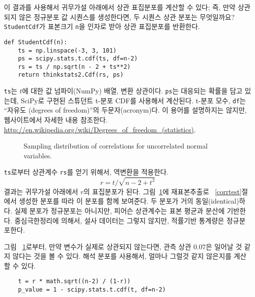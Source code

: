 이 결과를 사용해서 귀무가설 아래에서 상관 표집분포를 계산할 수 있다; 즉, 만약 상관되지 않은 정규분포 값 시퀀스를 생성한다면, 두 시퀀스 상관 분포는 무엇일까요? {\tt StudentCdf}가 표본크기 {\tt n}을 인자로 받아 상관 표집분포를 반환한다.

\begin{verbatim}
def StudentCdf(n):
    ts = np.linspace(-3, 3, 101)
    ps = scipy.stats.t.cdf(ts, df=n-2)
    rs = ts / np.sqrt(n - 2 + ts**2)
    return thinkstats2.Cdf(rs, ps)
\end{verbatim}

{\tt ts}는 $t$에 대한 값 넘파이(NumPy) 배열, 변환 상관이다.
{\tt ps}는 대응되는 확률을 담고 있는데, SciPy로 구현된 스튜던트 t-분포 CDF를 사용해서 계산된다. t-분포 모수, {\tt df}는 ``자유도 (degrees of freedom)''의 두문자(acronym)다. 이 용어를 설명하지는 않지만, 웹사이트에서 자세한 내용 참조한다. \url{http://en.wikipedia.org/wiki/Degrees_of_freedom_(statistics)}.

\begin{figure}
\caption{Sampling distribution of correlations for uncorrelated
normal variables.}
\label{normal4}
\end{figure}

{\tt ts}로부터 상관계수 {\tt rs}를 얻기 위해서, 역변환을 적용한다.
%
\[ r = t / \sqrt{n - 2 + t^2} \]
%
결과는 귀무가설 아래에서 $r$의 표집분포가 된다.
그림~\ref{normal4}에 재표본추출로 ~\ref{corrtest}절에서 생성한 분포를 따라 이 분포를 함께 보여준다.
두 분포가 거의 동일(identical)하다. 실제 분포가 정규분포는 아니지만, 피어슨 상관계수는 표본 평균과 분산에 기반한다. 중심극한정리에 의해서, 설사 데이터는 그렇지 않지만, 적률기반 통계량은 정규분포한다.


그림 ~\ref{normal4}로부터, 만약 변수가 실제로 상관되지 않는다면, 관측 상관 0.07은 일어날 것 같지 않다는 것을 볼 수 있다. 해석 분포를 사용해서, 얼마나 그럴것 같지 않은지를 계산할 수 있다.

\begin{verbatim}
    t = r * math.sqrt((n-2) / (1-r))
    p_value = 1 - scipy.stats.t.cdf(t, df=n-2)
\end{verbatim}

